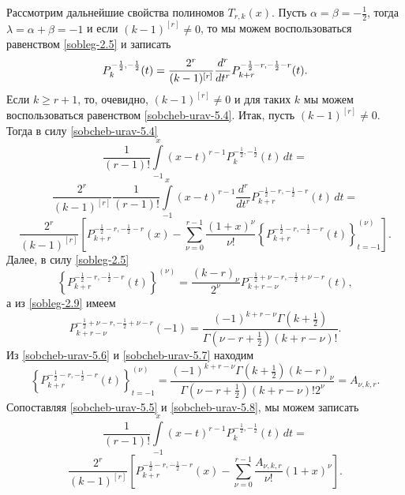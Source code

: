  Рассмотрим дальнейшие свойства полиномов $T_{r,k}(x)$.
Пусть $\alpha=\beta=-\frac{1}{2}$, тогда $\lambda=\alpha+\beta=-1$ и если $(k-1)^{[r]}\neq0$, то мы можем воспользоваться равенством \eqref{sobleg-2.5} и записать
\begin{equation}\label{sobcheb-urav-5.4}
P^{-\frac{1}{2},-\frac{1}{2}}_k(t)={2^r \over (k-1 )^{[r]}}\frac{d^r}{dt^r}P_{k+r}^{-\frac{1}{2}-r,-\frac{1}{2}-r}(t).
\end{equation}
 Если  $k\ge r+1$, то, очевидно, $(k-1)^{[r]}\neq0$ и для таких $k$ мы
можем  воспользоваться равенством \eqref{sobcheb-urav-5.4}. Итак, пусть $(k-1)^{[r]}\neq0$. Тогда в силу  \eqref{sobcheb-urav-5.4}
$$
\frac{1}{(r-1)!}\int\limits^x_{-1}(x-t)^{r-1}P_k^{-\frac{1}{2},-\frac{1}{2}}(t)\,dt=
$$
$$
\frac{2^r}{(k-1)^{[r]}}\frac{1}{(r-1)!}\int\limits^x_{-1}(x-t)^{r-1}
\frac{d^r}{dt^r}P_{k+r}^{-\frac{1}{2}-r,-\frac{1}{2}-r}(t)\,dt=
$$
\begin{equation}\label{sobcheb-urav-5.5}
\frac{2^r}{(k-1)^{[r]}}\left[P_{k+r}^{-\frac{1}{2}-r,-\frac{1}{2}-r}(x)-\sum^{r-1}_{\nu=0}
\frac{(1+x)^\nu}{\nu!}\left\{P_{k+r}^{-\frac{1}{2}-r,-\frac{1}{2}-r}(t)
\right\}_{t=-1}^{(\nu)}\right].
\end{equation}
 Далее, в силу \eqref{sobleg-2.5}
 \begin{equation}\label{sobcheb-urav-5.6}
\left\{P_{k+r}^{-\frac{1}{2}-r,-\frac{1}{2}-r}(t)\right\}^{(\nu)}=
\frac{(k-r)_\nu}{2^\nu}P_{k+r-\nu}^{-\frac{1}{2}+\nu-r,-\frac{1}{2}+\nu-r}(t),
\end{equation}
а из \eqref{sobleg-2.9} имеем 
\begin{equation}\label{sobcheb-urav-5.7}
P_{k+r-\nu}^{-\frac{1}{2}+\nu-r,-\frac{1}{2}+\nu-r}(-1)=\frac{(-1)^{k+r-\nu}\Gamma(k+\frac{1}{2})}{\Gamma(\nu-r+\frac{1}{2})(k+r-\nu)!}.
\end{equation}
Из \eqref{sobcheb-urav-5.6}  и \eqref{sobcheb-urav-5.7} находим
\begin{equation}\label{sobcheb-urav-5.8}
\left\{P_{k+r}^{-\frac{1}{2}-r,-\frac{1}{2}-r}(t)\right\}_{t=-1}^{(\nu)}=
\frac{(-1)^{k+r-\nu}\Gamma(k+\frac{1}{2})(k-r)_{\nu}}
{\Gamma(\nu-r+\frac{1}{2})(k+r-\nu)!2^\nu}=A_{\nu,k,r}.
\end{equation}
Сопоставляя \eqref{sobcheb-urav-5.5} и \eqref{sobcheb-urav-5.8}, мы можем записать
$$\frac{1}{(r-1)!}\int\limits^x_{-1}(x-t)^{r-1}P_k^{-\frac{1}{2},-\frac{1}{2}}(t)\,dt=$$
\begin{equation}\label{sobcheb-urav-5.9}
\frac{2^r}{(k-1)^{[r]}}\left[P_{k+r}^{-\frac{1}{2}-r,-\frac{1}{2}-r}(x)-\sum^{r-1}_{\nu=0}
\frac{A_{\nu,k,r}}{\nu!}(1+x)^{\nu}\right].
\end{equation}


